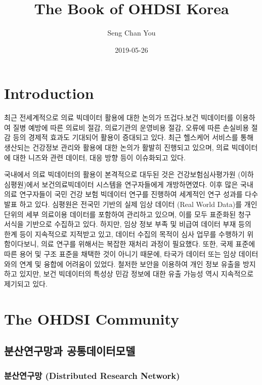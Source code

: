 \documentclass[]{book}
\title{The Book of OHDSI Korea}
\author{Seng Chan You}
\date{2019-05-26}
\begin{document}
\maketitle

{
\setcounter{tocdepth}{1}
\tableofcontents
}
\hypertarget{introduction}{%
\chapter{Introduction}\label{introduction}}

최근 전세계적으로 의료 빅데이터 활용에 대한 논의가 뜨겁다.보건 빅데이터를 이용하여 질병 예방에 따른 의료비 절감, 의료기관의 운영비용 절감, 오류에 따른 손실비용 절감 등의 경제적 효과도 기대되어 활용이 증대되고 있다. 최근 헬스케어 서비스를 통해 생산되는 건강정보 관리와 활용에 대한 논의가 활발히 진행되고 있으며, 의료 빅데이터에 대한 니즈와 관련 데이터, 대응 방향 등이 이슈화되고 있다.

국내에서 의료 빅데이터의 활용이 본격적으로 대두된 것은 건강보험심사평가원 (이하 심평원)에서 보건의료빅데이터 시스템을 연구자들에게 개방하면였다. 이후 많은 국내 의료 연구자들이 국민 건강 보험 빅데이터 연구를 진행하여 세계적인 연구 성과를 다수 발표 하고 있다. 심평원은 전국민 기반의 실제 임상 데이터 (Real World Data)를 개인 단위의 세부 의료이용 데이터를 포함하여 관리하고 있으며, 이를 모두 표준화된 청구 서식을 기반으로 수집하고 있다. 하지만, 임상 정보 부족 및 비급여 데이터 부재 등의 한계 등이 지속적으로 지적받고 있고, 데이터 수집의 목적이 심사 업무를 수행하기 위함이다보니, 의료 연구를 위해서는 복잡한 재처리 과정이 필요했다. 또한, 국제 표준에 따른 용어 및 구조 표준을 채택한 것이 아니기 때문에, 타국가 데이터 또는 임상 데이터와의 연계 및 융합에 어려움이 있었다. 철저한 보안을 이용하여 개인 정보 유출을 방지하고 있지만, 보건 빅데이터의 특성상 민감 정보에 대한 유출 가능성 역시 지속적으로 제기되고 있다.

\hypertarget{ohdsiCommunity}{%
\chapter{The OHDSI Community}\label{ohdsiCommunity}}

\hypertarget{drnCdm}{%
\section{분산연구망과 공통데이터모델}\label{drnCdm}}

\hypertarget{distributed-research-network}{%
\subsection{분산연구망 (Distributed Research Network)}\label{distributed-research-network}}
\end{document}
